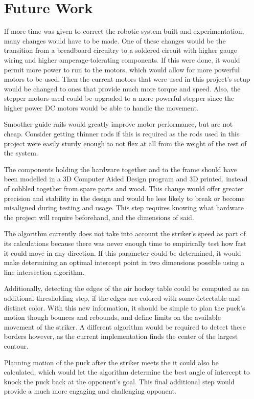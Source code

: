 \documentclass[letterpaper, 12 pt, conference]{ieeeconf}
\begin{document}
\section{Future Work}
\label{futurework}
If more time was given to correct the robotic system built and experimentation, many changes would have to be made.  One of these changes would be the transition from a breadboard circuitry to a soldered circuit with higher gauge wiring and higher amperage-tolerating components. If this were done, it would permit more power to run to the motors, which would allow for more powerful motors to be used. Then the current motors that were used in this project’s setup would be changed to ones that provide much more torque and speed.  Also, the stepper motors used could be upgraded to a more powerful stepper since the higher power DC motors would be able to handle the movement.

Smoother guide rails would greatly improve motor performance, but are not cheap. Consider getting thinner rods if this is required as the rods used in this project were easily sturdy enough to not flex at all from the weight of the rest of the system.

The components holding the hardware together and to the frame should have been modelled in a 3D Computer Aided Design program and 3D printed, instead of cobbled together from spare parts and wood. This change would offer greater precision and stability in the design and would be less likely to break or become misaligned during testing and usage. This step requires knowing what hardware the project will require beforehand, and the dimensions of said.

The algorithm currently does not take into account the striker’s speed as part of its calculations because there was never enough time to empirically test how fast it could move in any direction. If this parameter could be determined, it would make determining an optimal intercept point in two dimensions possible using a line intersection algorithm. 

Additionally, detecting the edges of the air hockey table could be computed as an additional thresholding step, if the edges are colored with some detectable and distinct color. With this new information, it should be simple to plan the puck’s motion though bounces and rebounds, and define limits on the available movement of the striker. A different algorithm would be required to detect these borders however, as the current implementation finds the center of the largest contour.

Planning motion of the puck after the striker meets the it could also be calculated, which would let the algorithm determine the best angle of intercept to knock the puck back at the opponent’s goal. This final additional step would provide a much more engaging and challenging opponent.




\end{document}
